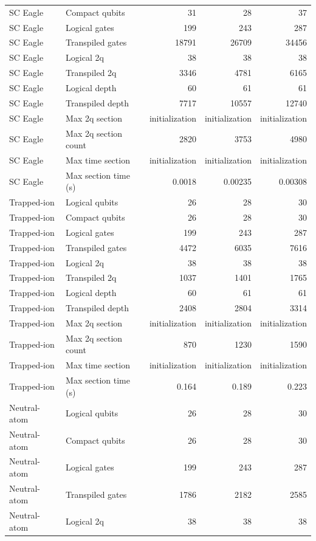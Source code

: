 \begin{table}
\begin{tabular}{llrrr}
SC Eagle & Compact qubits & 31 & 28 & 37 \\
SC Eagle & Logical gates & 199 & 243 & 287 \\
SC Eagle & Transpiled gates & 18791 & 26709 & 34456 \\
SC Eagle & Logical 2q & 38 & 38 & 38 \\
SC Eagle & Transpiled 2q & 3346 & 4781 & 6165 \\
SC Eagle & Logical depth & 60 & 61 & 61 \\
SC Eagle & Transpiled depth & 7717 & 10557 & 12740 \\
SC Eagle & Max 2q section & initialization & initialization & initialization \\
SC Eagle & Max 2q section count & 2820 & 3753 & 4980 \\
SC Eagle & Max time section & initialization & initialization & initialization \\
SC Eagle & Max section time (s) & 0.0018 & 0.00235 & 0.00308 \\
\hline
Trapped-ion & Logical qubits & 26 & 28 & 30 \\
Trapped-ion & Compact qubits & 26 & 28 & 30 \\
Trapped-ion & Logical gates & 199 & 243 & 287 \\
Trapped-ion & Transpiled gates & 4472 & 6035 & 7616 \\
Trapped-ion & Logical 2q & 38 & 38 & 38 \\
Trapped-ion & Transpiled 2q & 1037 & 1401 & 1765 \\
Trapped-ion & Logical depth & 60 & 61 & 61 \\
Trapped-ion & Transpiled depth & 2408 & 2804 & 3314 \\
Trapped-ion & Max 2q section & initialization & initialization & initialization \\
Trapped-ion & Max 2q section count & 870 & 1230 & 1590 \\
Trapped-ion & Max time section & initialization & initialization & initialization \\
Trapped-ion & Max section time (s) & 0.164 & 0.189 & 0.223 \\
\hline
Neutral-atom & Logical qubits & 26 & 28 & 30 \\
Neutral-atom & Compact qubits & 26 & 28 & 30 \\
Neutral-atom & Logical gates & 199 & 243 & 287 \\
Neutral-atom & Transpiled gates & 1786 & 2182 & 2585 \\
Neutral-atom & Logical 2q & 38 & 38 & 38 \\

\end{tabular}
\end{table}
